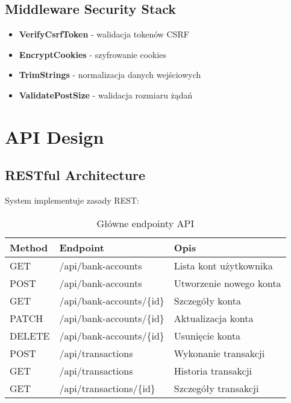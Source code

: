     \subsection{Middleware Security Stack}

    \begin{itemize}
        \item \textbf{VerifyCsrfToken} - walidacja tokenów CSRF
        \item \textbf{EncryptCookies} - szyfrowanie cookies
        \item \textbf{TrimStrings} - normalizacja danych wejściowych
        \item \textbf{ValidatePostSize} - walidacja rozmiaru żądań
    \end{itemize}

    \section{API Design}

    \subsection{RESTful Architecture}

    System implementuje zasady REST:

    \begin{table}[h]
        \centering
        \begin{tabular}{|l|l|l|}
            \hline
            \textbf{Method} & \textbf{Endpoint} & \textbf{Opis} \\
            \hline
            GET & /api/bank-accounts & Lista kont użytkownika \\
            POST & /api/bank-accounts & Utworzenie nowego konta \\
            GET & /api/bank-accounts/\{id\} & Szczegóły konta \\
            PATCH & /api/bank-accounts/\{id\} & Aktualizacja konta \\
            DELETE & /api/bank-accounts/\{id\} & Usunięcie konta \\
            \hline
            POST & /api/transactions & Wykonanie transakcji \\
            GET & /api/transactions & Historia transakcji \\
            GET & /api/transactions/\{id\} & Szczegóły transakcji \\
            \hline
        \end{tabular}
        \caption{Główne endpointy API}
    \end{table}

